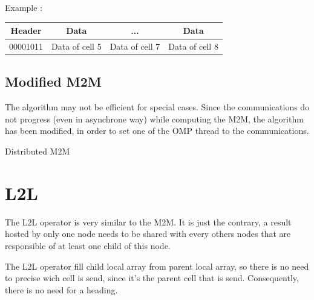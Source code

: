 \documentclass[12pt,letterpaper,titlepage]{report}
\begin{document}
Example :
\begin{tabular}{| c || c | c | c |}
  \hline
  Header & Data & ... & Data \\
  \hline
  00001011 & Data of cell 5 & Data of cell 7 & Data of cell 8 \\
  \hline
\end{tabular}

\subsection{Modified M2M}
The algorithm may not be efficient for special cases. Since the
communications do not progress (even in asynchrone way) while
computing the M2M, the algorithm has been modified, in order to set
one of the OMP thread to the communications.

\begin{algorithm}[H]
  \LinesNumbered
  \SetAlgoLined
  \BlankLine
  \BlankLine
  \caption{Distributed M2M}
\end{algorithm}


\clearpage
\section{L2L}
The L2L operator is very similar to the M2M.  It is just the contrary,
a result hosted by only one node needs to be shared with every others
nodes that are responsible of at least one child of this node.

The L2L operator fill child local array from parent local array, so
there is no need to precise wich cell is send, since it's the parent
cell that is send. Consequently, there is no need for a heading.
\end{document}
